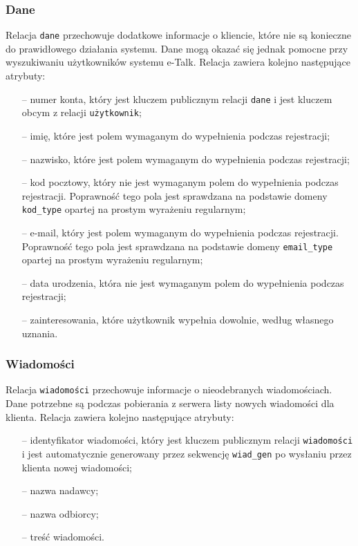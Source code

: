 \documentclass[a4paper,12pt]{article}
\begin{document}
\subsubsection[Dane]{Dane}
Relacja \texttt{dane} przechowuje dodatkowe informacje o kliencie, które nie są konieczne do prawidłowego działania systemu. Dane mogą okazać się jednak pomocne przy wyszukiwaniu użytkowników systemu e-Talk. Relacja zawiera kolejno następujące atrybuty:
\begin{itemize}
    \item[--] numer konta, który jest kluczem publicznym relacji \texttt{dane} i jest kluczem obcym z relacji \texttt{użytkownik};
    \item[--] imię, które jest polem wymaganym do wypełnienia podczas rejestracji;
    \item[--] nazwisko, które jest polem wymaganym do wypełnienia podczas rejestracji;
    \item[--] kod pocztowy, który nie jest wymaganym polem do wypełnienia podczas rejestracji. Poprawność
              tego pola jest sprawdzana na podstawie domeny \texttt{kod\_type} opartej na prostym wyrażeniu
              regularnym;
    \item[--] e-mail, który jest polem wymaganym do wypełnienia podczas rejestracji. Poprawność
              tego pola jest sprawdzana na podstawie domeny \texttt{email\_type} opartej na prostym wyrażeniu
              regularnym;
    \item[--] data urodzenia, która nie jest wymaganym polem do wypełnienia podczas rejestracji;
    \item[--] zainteresowania, które użytkownik wypełnia dowolnie, według własnego uznania.
\end{itemize}

\subsubsection[Wiadomości]{Wiadomości}
Relacja \texttt{wiadomości} przechowuje informacje o nieodebranych wiadomościach. Dane potrzebne są podczas pobierania z serwera listy nowych wiadomości dla klienta. Relacja zawiera kolejno następujące atrybuty:
\begin{itemize}
    \item[--] identyfikator wiadomości, który jest kluczem publicznym relacji \texttt{wiadomości} i jest automatycznie generowany przez sekwencję \texttt{wiad\_gen} po wysłaniu przez klienta nowej wiadomości;
    \item[--] nazwa nadawcy;
    \item[--] nazwa odbiorcy;
    \item[--] treść wiadomości.
\end{itemize}
\end{document}
